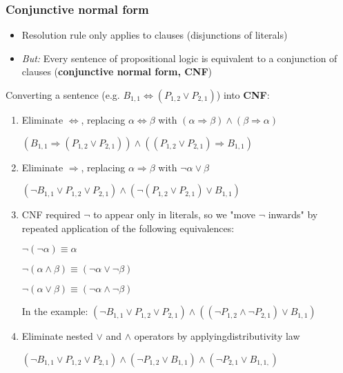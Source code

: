\documentclass{scrartcl}
\begin{document}
\subsubsection{Conjunctive normal form}
\begin{itemize}
    \item
        Resolution rule only applies to clauses (disjunctions of literals)
    \item
        \textit{But:} Every sentence of propositional logic is equivalent to a conjunction of clauses (\textbf{conjunctive normal form, CNF})
\end{itemize}
Converting a sentence (e.g. $B_{1,1} \Leftrightarrow (P_{1,2} \lor P_{2,1})$) into \textbf{CNF}:
\begin{enumerate}
    \item
        Eliminate $\Leftrightarrow$, replacing $\alpha \Leftrightarrow \beta$ with $(\alpha \Rightarrow \beta) \land (\beta \Rightarrow \alpha)$

        $(B_{1,1} \Rightarrow (P_{1,2} \lor P_{2,1})) \land ((P_{1,2} \lor P_{2,1}) \Rightarrow B_{1,1})$
    \item
        Eliminate $\Rightarrow$, replacing $\alpha \Rightarrow \beta$ with $\lnot \alpha \lor \beta$

        $(\lnot B_{1,1} \lor P_{1,2} \lor P_{2,1}) \land (\lnot (P_{1,2} \lor P_{2,1}) \lor B_{1,1})$
    \item
        CNF required $\lnot$ to appear only in literals, so we "move $\lnot$ inwards" by repeated application of the following equivalences:

        $\lnot(\lnot \alpha) \equiv \alpha$

        $\lnot(\alpha \land \beta) \equiv (\lnot \alpha \lor \lnot \beta)$

        $\lnot(\alpha \lor \beta) \equiv (\lnot \alpha \land \lnot \beta)$

        In the example:
        $(\lnot B_{1,1} \lor P_{1,2} \lor P_{2,1}) \land ((\lnot P_{1,2} \land \lnot P_{2,1}) \lor B_{1,1})$

    \item
        Eliminate nested $\lor$ and $\land$ operators by applyingdistributivity law

        $(\lnot B_{1,1} \lor P_{1,2} \lor P_{2,1}) \land (\lnot P_{1,2} \lor B_{1,1}) \land (\lnot P_{2,1} \lor B_{1,1,})$
\end{enumerate}
\end{document}
